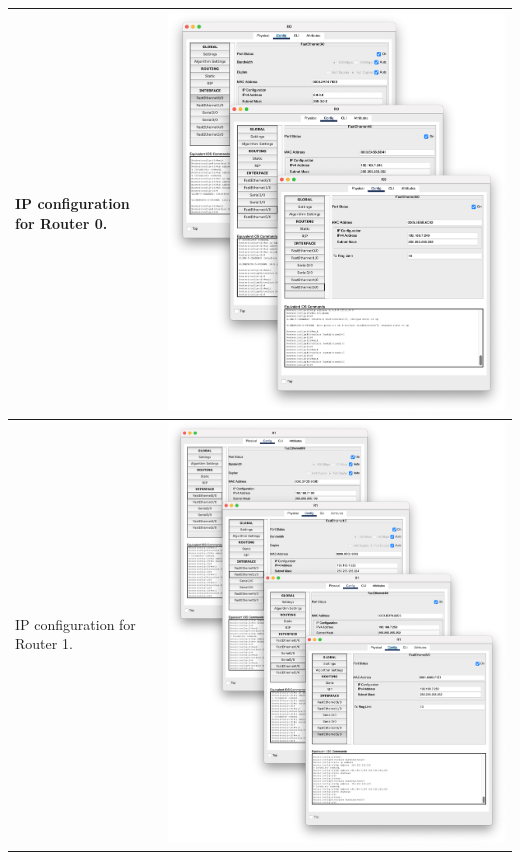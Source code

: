 \documentclass[11pt,a4paper]{report}
\begin{document}
\begin{flushleft}
\begin{center}
\begin{longtable}{ m{5cm} l }
                        IP configuration for Router 0.  & \includegraphics[scale=0.245 ,valign=c]{r0-ipall}                      \\ \hline
                        IP configuration for Router 1.  & \includegraphics[scale=0.22  ,valign=c]{r1-ipall}                      \\ \hline

\end{longtable}
\end{center}
\end{flushleft}
\end{document}

